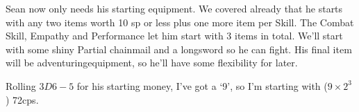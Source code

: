   \begin{exampletext}

    Sean now only needs his starting equipment.
    We covered already that he starts with any two items worth 10 \gls{sp} or less plus one more item per Skill.
    The Combat Skill, Empathy and Performance let him start with 3 items in total.
    We'll start with some shiny Partial chainmail and a longsword so he can fight.
    His final item will be \gls{adventuringequipment}, so he'll have some flexibility for later.

  Rolling $3D6-5$ for his starting money, I've got a `9', so I'm starting with ($9\times 2^3$) 72\glspl{cp}.

\end{exampletext}
